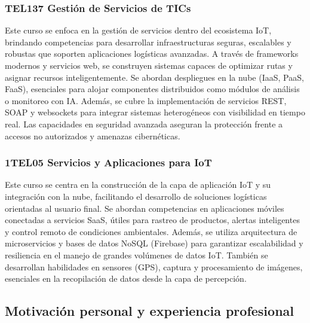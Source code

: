 \subsubsection{TEL137 Gestión de Servicios de TICs}

Este curso se enfoca en la gestión de servicios dentro del ecosistema IoT, brindando
competencias para desarrollar infraestructuras seguras, escalables y robustas que soporten
aplicaciones logísticas avanzadas. A través de frameworks modernos y servicios web, se
construyen sistemas capaces de optimizar rutas y asignar recursos inteligentemente. Se abordan
despliegues en la nube (IaaS, PaaS, FaaS), esenciales para alojar componentes distribuidos
como módulos de análisis o monitoreo con IA. Además, se cubre la implementación de
servicios REST, SOAP y websockets para integrar sistemas heterogéneos con visibilidad en
tiempo real. Las capacidades en seguridad avanzada aseguran la protección frente a accesos no
autorizados y amenazas cibernéticas.

\subsubsection{1TEL05 Servicios y Aplicaciones para IoT}

Este curso se centra en la construcción de la capa de aplicación IoT y su integración con la
nube, facilitando el desarrollo de soluciones logísticas orientadas al usuario final. Se abordan
competencias en aplicaciones móviles conectadas a servicios SaaS, útiles para rastreo de
productos, alertas inteligentes y control remoto de condiciones ambientales. Además, se utiliza
arquitectura de microservicios y bases de datos NoSQL (Firebase) para garantizar escalabilidad
y resiliencia en el manejo de grandes volúmenes de datos IoT. También se desarrollan
habilidades en sensores (GPS), captura y procesamiento de imágenes, esenciales en la
recopilación de datos desde la capa de percepción.
\subsection{Motivación personal y experiencia profesional}


